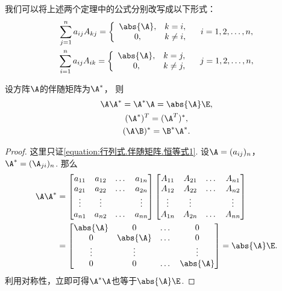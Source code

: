 我们可以将上述两个定理中的公式分别改写成以下形式：
\begin{gather}
	\sum_{j=1}^n a_{ij} A_{kj}
	= \left\{ \begin{array}{cl}
		\abs{\A}, & k = i, \\
		0, & k \neq i,
	\end{array} \right.
	\quad i=1,2,\dotsc,n, \\
	\sum_{i=1}^n a_{ij} A_{ik}
	= \left\{ \begin{array}{cl}
		\abs{\A}, & k = j, \\
		0, & k \neq j,
	\end{array} \right.
	\quad j=1,2,\dotsc,n,
\end{gather}

\begin{theorem}
设方阵\(\A\)的伴随矩阵为\(\A^*\)，
则\begin{gather}
	\A \A^* = \A^* \A = \abs{\A} \E, \label{equation:行列式.伴随矩阵.恒等式1} \\
	(\A^*)^T = (\A^T)^*, \label{equation:行列式.伴随矩阵.恒等式2} \\
	(\A \B)^* = \B^* \A^*. \label{equation:行列式.伴随矩阵.恒等式3}
\end{gather}
\begin{proof}
这里只证\cref{equation:行列式.伴随矩阵.恒等式1}.
设\(\A=(a_{ij})_n\)，\(\A^*=(\A_{ji})_n\).
那么\begin{align*}
	\A\A^*
	&= \begin{bmatrix}
		a_{11} & a_{12} & \dots & a_{1n} \\
		a_{21} & a_{22} & \dots & a_{2n} \\
		\vdots & \vdots & & \vdots \\
		a_{n1} & a_{n2} & \dots & a_{nn} \\
	\end{bmatrix}
	\begin{bmatrix}
		A_{11} & A_{21} & \dots & A_{n1} \\
		A_{12} & A_{22} & \dots & A_{n2} \\
		\vdots & \vdots & & \vdots \\
		A_{1n} & A_{2n} & \dots & A_{nn}
	\end{bmatrix} \\
	&= \begin{bmatrix}
		\abs{\A} & 0 & \dots & 0 \\
		0 & \abs{\A} & \dots & 0 \\
		\vdots & \vdots & & \vdots \\
		0 & 0 & \dots & \abs{\A}
	\end{bmatrix}
	= \abs{\A} \E.
\end{align*}
利用对称性，立即可得\(\A^*\A\)也等于\(\abs{\A} \E\).
\end{proof}
\end{theorem}

